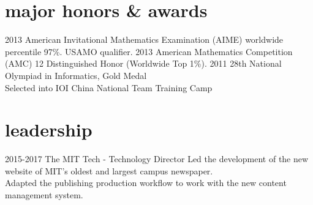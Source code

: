 \documentclass[print]{friggeri-cv} %
\begin{document}
\section{major honors \& awards}

\begin{entrylist}
  \centry
  {2013}
  {American Invitational Mathematics Examination (AIME) worldwide percentile 97\%. USAMO qualifier. }
  \centry
  {2013}
  {American Mathematics Competition (AMC) 12 Distinguished Honor (Worldwide Top 1\%). }
  \centry
  {2011}
  {28th National Olympiad in Informatics, Gold Medal \\
  Selected into IOI China National Team Training Camp}
\end{entrylist}



\section{leadership}

\begin{entrylist}
  \entry
  {2015-2017}
  {The MIT Tech - Technology Director}
  {}
  {Led the development of the new website of MIT's oldest and largest campus newspaper. \\
  Adapted the publishing production workflow to work with the new content management system. }
\end{entrylist}
\end{document}
